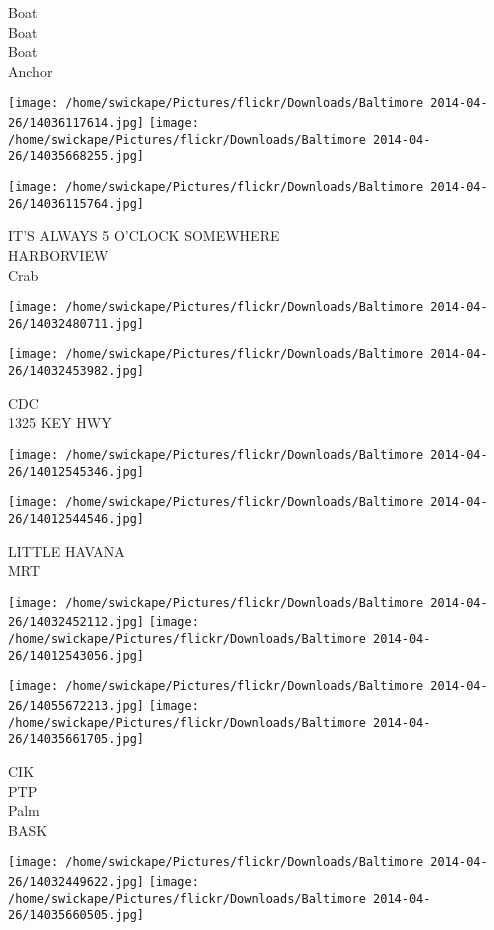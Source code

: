\documentclass[10pt,letterpaper]{article}
\begin{document}
Boat\\
Boat\\
Boat\\
Anchor
\pagebreak

\texttt{[image: /home/swickape/Pictures/flickr/Downloads/Baltimore 2014-04-26/14036117614.jpg]}
\texttt{[image: /home/swickape/Pictures/flickr/Downloads/Baltimore 2014-04-26/14035668255.jpg]}

\texttt{[image: /home/swickape/Pictures/flickr/Downloads/Baltimore 2014-04-26/14036115764.jpg]}

IT'S ALWAYS 5 O'CLOCK SOMEWHERE\\
HARBORVIEW\\
Crab
\pagebreak

\texttt{[image: /home/swickape/Pictures/flickr/Downloads/Baltimore 2014-04-26/14032480711.jpg]}

\vspace{0.25in}
\texttt{[image: /home/swickape/Pictures/flickr/Downloads/Baltimore 2014-04-26/14032453982.jpg]}

CDC\\
1325 KEY HWY
\pagebreak

\texttt{[image: /home/swickape/Pictures/flickr/Downloads/Baltimore 2014-04-26/14012545346.jpg]}

\vspace{0.25in}
\texttt{[image: /home/swickape/Pictures/flickr/Downloads/Baltimore 2014-04-26/14012544546.jpg]}

LITTLE HAVANA\\
MRT
\pagebreak

\texttt{[image: /home/swickape/Pictures/flickr/Downloads/Baltimore 2014-04-26/14032452112.jpg]}
\texttt{[image: /home/swickape/Pictures/flickr/Downloads/Baltimore 2014-04-26/14012543056.jpg]}

\texttt{[image: /home/swickape/Pictures/flickr/Downloads/Baltimore 2014-04-26/14055672213.jpg]}
\texttt{[image: /home/swickape/Pictures/flickr/Downloads/Baltimore 2014-04-26/14035661705.jpg]}

CIK\\
PTP\\
Palm\\
BASK
\pagebreak

\texttt{[image: /home/swickape/Pictures/flickr/Downloads/Baltimore 2014-04-26/14032449622.jpg]}
\texttt{[image: /home/swickape/Pictures/flickr/Downloads/Baltimore 2014-04-26/14035660505.jpg]}
\end{document}
